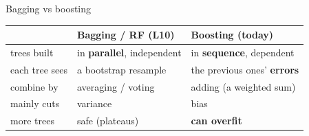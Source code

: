 \documentclass[aspectratio=169]{beamer}
\begin{document}
\begin{frame}{Bagging vs boosting}
  \begin{center}\small
    \renewcommand{\arraystretch}{1.3}
    \begin{tabular}{l l l}
      & \textbf{Bagging / RF (L10)} & \textbf{Boosting (today)} \\
      \hline
      trees built & in \textbf{parallel}, independent & in \textbf{sequence}, dependent \\
      each tree sees & a bootstrap resample & the previous ones' \textbf{errors} \\
      combine by & averaging / voting & adding (a weighted sum) \\
      mainly cuts & \textcolor{armblue}{variance} & \textcolor{armred}{bias} \\
      more trees & safe (plateaus) & \textbf{can overfit} \\
      \hline
    \end{tabular}
  \end{center}
  \vfill
\end{frame}
\end{document}
